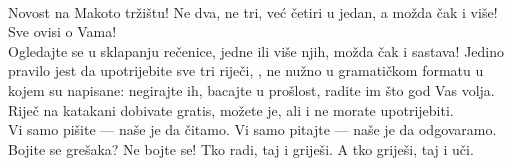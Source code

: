 \documentclass[pig]{grampig}
\begin{document}
	\begin{minipage}{\width}
		\onehalfspacing
		{\Large {}}  \\[-0.5em]
		
		Novost na Makoto tržištu! 
		Ne dva, ne tri, već četiri u jedan, a možda čak i više! Sve ovisi o Vama!  \\[-0.5em]
		
		Ogledajte se u sklapanju rečenice, jedne ili više njih, možda čak i sastava!
		Jedino pravilo jest da upotrijebite sve tri riječi, , ne nužno u gramatičkom formatu u kojem su napisane: negirajte ih, bacajte u prošlost, radite im što god Vas volja. 
		Riječ na katakani dobivate gratis, možete je, ali i ne morate upotrijebiti.  \\[-0.5em]
		
		Vi samo pišite --- naše je da čitamo.
		Vi samo pitajte --- naše je da odgovaramo. 
		Bojite se grešaka? Ne bojte se!
		Tko radi, taj i griješi. 
		A tko griješi, taj i uči. \\[-1.5em]
		
		
%			
%			
	\end{minipage}
\end{document}

